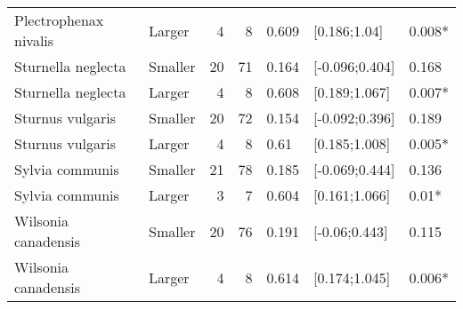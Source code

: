 \documentclass{article}
\begin{document}
\begin{table}[H]
\begin{tabular}{llrrlll}
  Plectrophenax nivalis & Larger & 4 & 8 & 0.609 & [0.186;1.04] & 0.008* \\ 
  Sturnella neglecta & Smaller & 20 & 71 & 0.164 & [-0.096;0.404] & 0.168 \\ 
  Sturnella neglecta & Larger & 4 & 8 & 0.608 & [0.189;1.067] & 0.007* \\ 
  Sturnus vulgaris & Smaller & 20 & 72 & 0.154 & [-0.092;0.396] & 0.189 \\ 
  Sturnus vulgaris & Larger & 4 & 8 & 0.61 & [0.185;1.008] & 0.005* \\ 
  Sylvia communis & Smaller & 21 & 78 & 0.185 & [-0.069;0.444] & 0.136 \\ 
  Sylvia communis & Larger & 3 & 7 & 0.604 & [0.161;1.066] & 0.01* \\ 
  Wilsonia canadensis & Smaller & 20 & 76 & 0.191 & [-0.06;0.443] & 0.115 \\ 
  Wilsonia canadensis & Larger & 4 & 8 & 0.614 & [0.174;1.045] & 0.006* \\ 
  \hline
  \end{tabular}
  \end{table}
  
  
  
\end{document}
